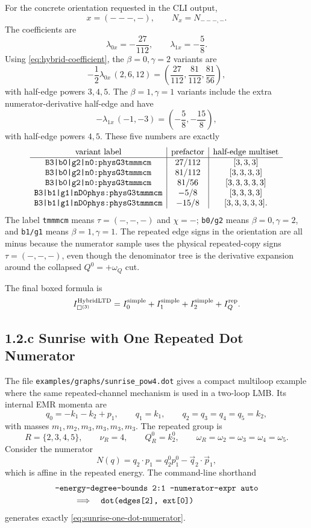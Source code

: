 \documentclass[11pt,a4paper]{report}
\begin{document}
For the concrete orientation requested in the CLI output,
\[
  x=(---,-),\qquad
  N_x=N_{---,-}.
\]
The coefficients are
\[
  \lambda_{0x}=-\frac{27}{112},
  \qquad
  \lambda_{1x}=-\frac{5}{8}.
\]
Using \eqref{eq:hybrid-coefficient}, the \(\beta=0,\gamma=2\) variants are
\[
  -\frac{1}{2}\lambda_{0x}\,(2,6,12)
  =
  \left(\frac{27}{112},\frac{81}{112},\frac{81}{56}\right),
\]
with half-edge powers \(3,4,5\).  The \(\beta=1,\gamma=1\) variants include the
extra numerator-derivative half-edge and have
\[
  -\lambda_{1x}\,(-1,-3)
  =
  \left(-\frac{5}{8},-\frac{15}{8}\right),
\]
with half-edge powers \(4,5\).  These five numbers are exactly
\[
\begin{array}{c|c|c}
\hbox{variant label} & \hbox{prefactor} & \hbox{half-edge multiset}\\
\hline
\texttt{B3|b0|g2|n0:physG3tmmmcm} & 27/112 & [3,3,3]\\
\texttt{B3|b0|g2|n0:physG3tmmmcm} & 81/112 & [3,3,3,3]\\
\texttt{B3|b0|g2|n0:physG3tmmmcm} & 81/56 & [3,3,3,3,3]\\
\texttt{B3|b1|g1|nD0phys:physG3tmmmcm} & -5/8 & [3,3,3,3]\\
\texttt{B3|b1|g1|nD0phys:physG3tmmmcm} & -15/8 & [3,3,3,3,3].
\end{array}
\]
The label \texttt{tmmmcm} means
\(\tau=(-,-,-)\) and \(\chi=-\); \texttt{b0/g2} means
\(\beta=0,\gamma=2\), and \texttt{b1/g1} means
\(\beta=1,\gamma=1\).  The repeated edge signs in the orientation are all
minus because the numerator sample uses the physical repeated-copy signs
\(\tau=(-,-,-)\), even though the denominator tree is the derivative expansion
around the collapsed \(Q^0=+\omega_Q\) cut.

The final boxed formula is
\[
  I^{\rm HybridLTD}_{\Box^{(3)}} =
  I_0^{\rm simple}+I_1^{\rm simple}+I_2^{\rm simple}+I_Q^{\rm rep}.
\]

\subsection*{1.2.c Sunrise with One Repeated Dot Numerator}

The file \texttt{examples/graphs/sunrise\_pow4.dot} gives a compact multiloop
example where the same repeated-channel mechanism is used in a two-loop LMB.
Its internal EMR momenta are
\[
  q_0=-k_1-k_2+p_1,\qquad q_1=k_1,\qquad
  q_2=q_3=q_4=q_5=k_2 ,
\]
with masses \(m_1,m_2,m_3,m_3,m_3,m_3\).  The repeated group is
\[
  R=\{2,3,4,5\},\qquad \nu_R=4,\qquad Q_R^0=k_2^0,\qquad
  \omega_R=\omega_2=\omega_3=\omega_4=\omega_5 .
\]
Consider the numerator
\[
  N(q)=q_2\cdot p_1
  =
  q_2^0p_1^0-\vec q_2\cdot\vec p_1 ,
  \label{eq:sunrise-one-dot-numerator}
\]
which is affine in the repeated energy.  The command-line shorthand
\[
\begin{aligned}
&\texttt{--energy-degree-bounds 2:1 --numerator-expr auto}\\
&\hspace{8mm}\Longrightarrow\quad
  \texttt{dot(edges[2], ext[0])}
\end{aligned}
\]
generates exactly \eqref{eq:sunrise-one-dot-numerator}.
\end{document}
